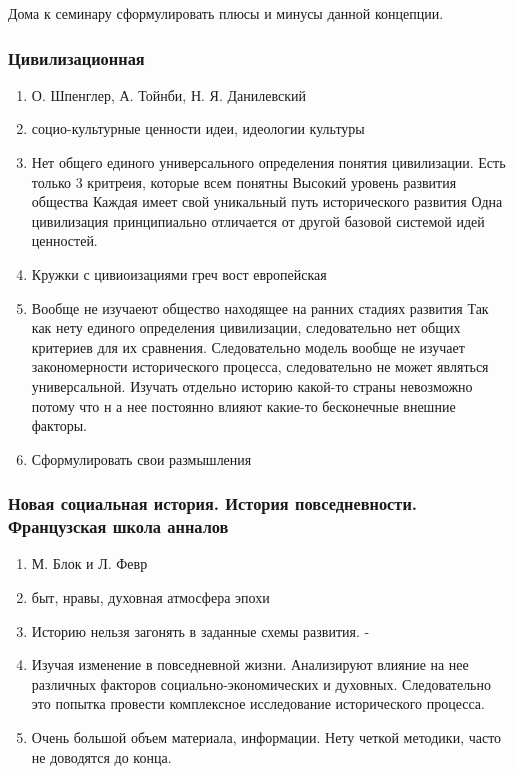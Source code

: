 \documentclass[a4paper]{article}
\begin{document}
    Дома к семинару сформулировать плюсы и минусы данной концепции.

\subsubsection{Цивилизационная}
\begin{enumerate}
    \item О. Шпенглер, А. Тойнби, Н. Я. Данилевский
    \item социо-культурные ценности идеи, идеологии культуры
    \item Нет общего единого универсального определения понятия цивилизации. Есть только 3 критреия, которые всем понятны
    Высокий уровень развития общества
    Каждая имеет свой уникальный путь исторического развития
    Одна цивилизация принципиально отличается от другой базовой системой идей ценностей.
    \item Кружки с цивиоизациями греч вост европейская
    \item Вообще не изучаеют общество находящее на ранних стадиях развития
    Так как нету единого определения цивилизации, следовательно нет общих критериев для их сравнения. Следовательно модель вообще не изучает закономерности исторического процесса, следовательно не может являться универсальной.
    Изучать отдельно историю какой-то страны невозможно потому что н а нее постоянно влияют какие-то бесконечные внешние факторы.
    \item Сформулировать свои размышления
\end{enumerate}
\subsubsection{Новая социальная история. История повседневности. Французская школа анналов}
\begin{enumerate}
\item М. Блок и Л. Февр
\item быт, нравы, духовная атмосфера эпохи
\item Историю нельзя загонять в заданные схемы развития. -
\item Изучая изменение в повседневной жизни. Анализируют влияние на нее различных факторов социально-экономических и духовных. Следовательно это попытка провести комплексное исследование исторического процесса.
\item Очень большой объем материала, информации. Нету четкой методики, часто не доводятся до конца.
\end{enumerate}
\end{document}
